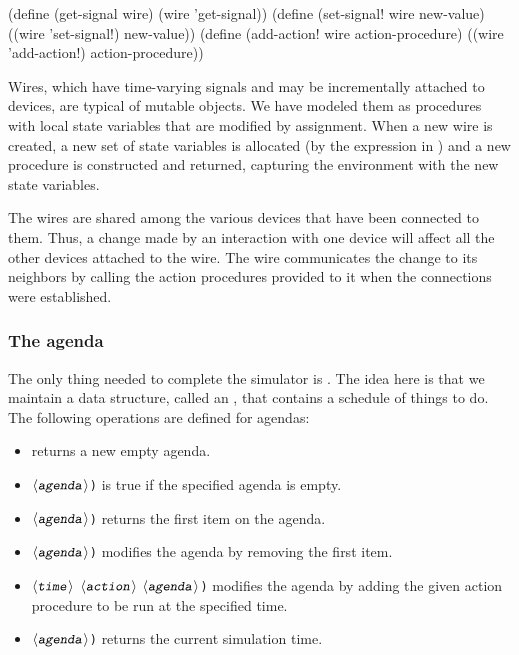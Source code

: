 \begin{codeBlock}
(define (get-signal wire) (wire 'get-signal))
(define (set-signal! wire new-value)
  ((wire 'set-signal!) new-value))
(define (add-action! wire action-procedure)
  ((wire 'add-action!) action-procedure))
\end{codeBlock}

\noindent
Wires, which have time-varying signals and may be incrementally attached to
devices, are typical of mutable objects.  We have modeled them as procedures
with local state variables that are modified by assignment.  When a new wire is
created, a new set of state variables is allocated (by the 
expression in ) and a new  procedure is
constructed and returned, capturing the environment with the new state
variables.

The wires are shared among the various devices that have been connected to
them.  Thus, a change made by an interaction with one device will affect all
the other devices attached to the wire.  The wire communicates the change to
its neighbors by calling the action procedures provided to it when the
connections were established.

\subsubsection*{The agenda}

The only thing needed to complete the simulator is .  The
idea here is that we maintain a data structure, called an ,
that contains a schedule of things to do.  The following operations are defined
for agendas:

\begin{itemize}
\item
{} returns a new empty agenda.

\item
{} $\langle\texttt{\textsl{agenda}}\rangle$\texttt{)} is true if the specified agenda is
empty.
\item
{} $\langle\texttt{\textsl{agenda}}\rangle$\texttt{)} returns the first item on the
agenda.
\item
{} $\langle\texttt{\textsl{agenda}}\rangle$\texttt{)} modifies the agenda by
removing the first item.
\item
{} $\langle\texttt{\textsl{time}}\rangle$ $\langle\texttt{\textsl{action}}\rangle$ $\langle\texttt{\textsl{agenda}}\rangle$\texttt{)} modifies the agenda by adding the given action procedure to be run at the specified time.
\item
{} $\langle\texttt{\textsl{agenda}}\rangle$\texttt{)} returns the current simulation time.
\end{itemize}

